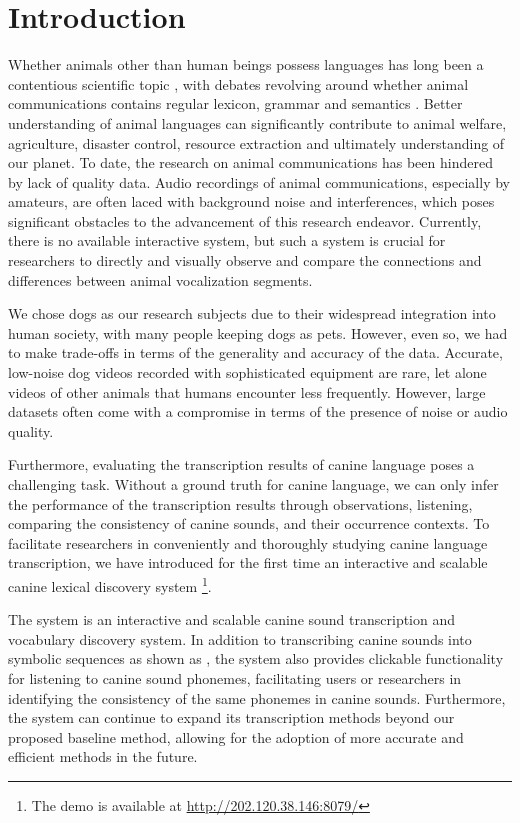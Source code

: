 \section{Introduction}

Whether animals other than human beings possess languages has long been a 
contentious scientific topic \citet{snowdon1990language}, with debates revolving around whether 
animal communications contains regular lexicon, grammar and semantics \citet{rendall2021aping}. 
Better understanding of animal languages can significantly contribute to animal
welfare, agriculture, disaster control, resource extraction and ultimately
understanding of our planet. To date, the research on animal communications
has been hindered by lack of quality data. Audio recordings of animal
communications, especially by amateurs, are often laced with 
background noise and interferences, which poses significant obstacles 
to the advancement of this research endeavor. Currently, there is no available interactive system, 
but such a system is crucial for researchers to directly and visually 
observe and compare the connections and differences between animal vocalization segments.

We chose dogs as our research subjects due to their widespread integration into human society, with many people keeping dogs as pets. However, even so, we had to make trade-offs in terms of the generality and accuracy of the data. Accurate, low-noise dog videos recorded with sophisticated equipment are rare, let alone videos of other animals that humans encounter less frequently. However, large datasets often come with a compromise in terms of the presence of noise or audio quality.

Furthermore, evaluating the transcription results of canine language poses a challenging task. Without a ground truth for canine language, we can only infer the performance of the transcription results through observations, listening, comparing the consistency of canine sounds, and their occurrence contexts. To facilitate researchers in conveniently and thoroughly studying canine language transcription, we have introduced for the first time an interactive and scalable canine lexical discovery system \footnote{The demo is available at \url{http://202.120.38.146:8079/}}.

The system is an interactive and scalable canine sound transcription and vocabulary discovery system. In addition to transcribing canine sounds into symbolic sequences as shown as , the system also provides clickable functionality for listening to canine sound phonemes, facilitating users or researchers in identifying the consistency of the same phonemes in canine sounds. Furthermore, the system can continue to expand its transcription methods beyond our proposed baseline method, allowing for the adoption of more accurate and efficient methods in the future.

